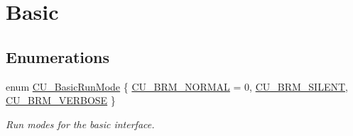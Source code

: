 \hypertarget{group___basic}{\section{Basic}
\label{group___basic}
}
\subsection*{Enumerations}
\begin{DoxyCompactItemize}
\item 
enum \hyperlink{group___basic_ga2f7ec57f8b59cfef5c5600bafa4865a6}{C\+U\+\_\+\+Basic\+Run\+Mode} \{ \hyperlink{group___basic_gga2f7ec57f8b59cfef5c5600bafa4865a6a9ef29da018d441e7c8e58b9a1676573b}{C\+U\+\_\+\+B\+R\+M\+\_\+\+N\+O\+R\+M\+A\+L} = 0, 
\hyperlink{group___basic_gga2f7ec57f8b59cfef5c5600bafa4865a6aa7f2cb5a71733216814b6e3d61dcb24e}{C\+U\+\_\+\+B\+R\+M\+\_\+\+S\+I\+L\+E\+N\+T}, 
\hyperlink{group___basic_gga2f7ec57f8b59cfef5c5600bafa4865a6a7ce505dc562e2fbf20505059114afea9}{C\+U\+\_\+\+B\+R\+M\+\_\+\+V\+E\+R\+B\+O\+S\+E}
 \}
\begin{DoxyCompactList}\small\item\em Run modes for the basic interface. \end{DoxyCompactList}\end{DoxyCompactItemize}
